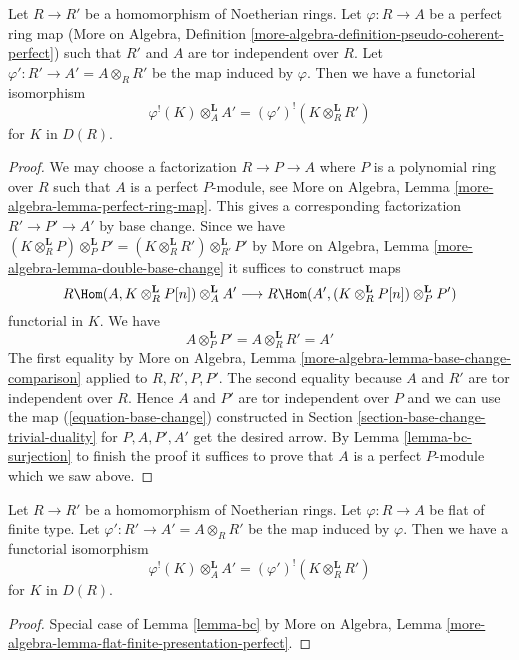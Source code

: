 \begin{lemma}
\label{lemma-bc}
Let $R \to R'$ be a homomorphism of Noetherian rings.
Let $\varphi : R \to A$ be a perfect ring map
(More on Algebra, Definition
\ref{more-algebra-definition-pseudo-coherent-perfect})
such that $R'$ and $A$ are tor independent over $R$.
Let $\varphi' : R' \to A' = A \otimes_R R'$ be the map induced by $\varphi$.
Then we have a functorial isomorphism
$$
\varphi^!(K) \otimes_A^\mathbf{L} A' =
(\varphi')^!(K \otimes_R^\mathbf{L} R')
$$
for $K$ in $D(R)$.
\end{lemma}

\begin{proof}
We may choose a factorization $R \to P \to A$ where $P$
is a polynomial ring over $R$ such that $A$ is a perfect $P$-module, see
More on Algebra, Lemma \ref{more-algebra-lemma-perfect-ring-map}.
This gives a corresponding factorization $R' \to P' \to A'$ by base change.
Since we have $(K \otimes_R^\mathbf{L} P) \otimes_P^\mathbf{L} P' =
(K \otimes_R^\mathbf{L} R') \otimes_{R'}^\mathbf{L} P'$
by More on Algebra, Lemma \ref{more-algebra-lemma-double-base-change}
it suffices to construct maps
$$
R\Hom(A, K \otimes_R^\mathbf{L} P[n]) \otimes_A^\mathbf{L} A'
\longrightarrow
R\Hom(A', (K \otimes_R^\mathbf{L} P[n]) \otimes_P^\mathbf{L} P')
$$
functorial in $K$. We have
$$
A \otimes_P^\mathbf{L} P' = A \otimes_R^\mathbf{L} R' = A'
$$
The first equality by
More on Algebra, Lemma \ref{more-algebra-lemma-base-change-comparison}
applied to $R, R', P, P'$. The second equality because
$A$ and $R'$ are tor independent over $R$. Hence $A$ and $P'$ are
tor independent over $P$ and we can use the map (\ref{equation-base-change})
constructed in Section \ref{section-base-change-trivial-duality} for
$P, A, P', A'$
get the desired arrow. By Lemma \ref{lemma-bc-surjection}
to finish the proof it suffices to prove that $A$ is a perfect $P$-module
which we saw above.
\end{proof}

\begin{lemma}
\label{lemma-bc-flat}
Let $R \to R'$ be a homomorphism of Noetherian rings.
Let $\varphi : R \to A$ be flat of finite type.
Let $\varphi' : R' \to A' = A \otimes_R R'$ be the map induced by $\varphi$.
Then we have a functorial isomorphism
$$
\varphi^!(K) \otimes_A^\mathbf{L} A' =
(\varphi')^!(K \otimes_R^\mathbf{L} R')
$$
for $K$ in $D(R)$.
\end{lemma}

\begin{proof}
Special case of Lemma \ref{lemma-bc} by
More on Algebra, Lemma
\ref{more-algebra-lemma-flat-finite-presentation-perfect}.
\end{proof}

